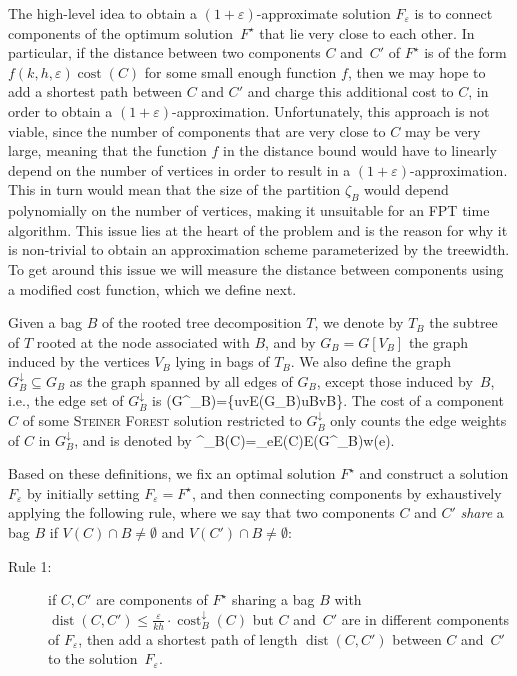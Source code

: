 \documentclass[a4paper]{article}
\makeatletter
\theoremstyle{plain}
\newcommand{\eps}{{\varepsilon}}
\def\[#1\]{\begin{doitall}#1\end{doitall}}
\newcommand{\pname}[1]{\textsc{#1}}
\newcommand{\customlabel}[2]{%
   \protected@write \@auxout {}{\string \newlabel {#1}{{#2}{\thepage}{#2}{#1}{}} }%
   \hypertarget{#1}{}
}
\DeclareMathOperator{\cost}{cost}
\DeclareMathOperator{\dist}{dist}
\newcommand{\SF}{\pname{Steiner Forest}\xspace}
\makeatother
\begin{document}
The high-level idea to obtain a $(1+\eps)$-approximate solution $F_\eps$ is to connect components of the optimum solution~$F^\star$ that lie very close to each other. In particular, if the distance between two components $C$ and~$C'$ of $F^\star$ is of the form $f(k,h,\eps)\cost(C)$ for some small enough function $f$, then we may hope to add a shortest path between $C$ and $C'$ and charge this additional cost to $C$, in order to obtain a $(1+\eps)$-approximation. Unfortunately, this approach is not viable, since the number of components that are very close to $C$ may be very large, meaning that the function $f$ in the distance bound would have to linearly depend on the number of vertices in order to result in a $(1+\eps)$-approximation. This in turn would mean that the size of the partition $\zeta_B$ would depend polynomially on the number of vertices, making it unsuitable for an FPT time algorithm. This issue lies at the heart of the problem and is the reason for why it is non-trivial to obtain an approximation scheme parameterized by the treewidth. To get around this issue we will measure the distance between components using a modified cost function, which we define next.

Given a bag $B$ of the rooted tree decomposition $T$, we denote by $T_B$
the subtree of $T$ rooted at the node associated with $B$, and by $G_B=G[V_B]$ the graph induced by 
the vertices $V_B$ lying in bags of $T_B$. We also define the graph 
$G^\downarrow_B\subseteq G_B$ as the graph spanned by all edges of $G_B$, 
except those induced by~$B$, i.e., the edge set of $G^\downarrow_B$ is
\[
E(G^\downarrow_B)=\{uv\in E(G_B)\mid u\notin B\lor v\notin B\}.
\] 
The cost of a component $C$ of some \SF solution restricted to $G^\downarrow_B$
only counts the edge weights of $C$ in $G^\downarrow_B$, and is denoted by
\[
\cost^\downarrow_B(C)=\sum_{e\in E(C)\cap E(G^\downarrow_B)}w(e).
\]

Based on these definitions, we fix an optimal solution $F^\star$ and construct
a solution $F_\eps$ by initially setting $F_\eps=F^\star$, and then connecting
components by exhaustively applying the following rule, where we say that two
components $C$ and $C'$ \emph{share} a bag $B$ if $V(C)\cap B\neq\emptyset$ and
$V(C')\cap B\neq\emptyset$:

\begin{description}
    \item[Rule 1:]\customlabel{rule1}{Rule~1} if $C,C'$ are components of $F^\star$ sharing a bag $B$ with $\dist(C,C')\le\frac{\eps}{kh}\cdot\cost^\downarrow_B(C)$ but $C$ and~$C'$ are in different components of $F_\eps$, then add a shortest path of length $\dist(C,C')$ between $C$ and~$C'$ to the solution~$F_\eps$.
\end{description}
\end{document}
